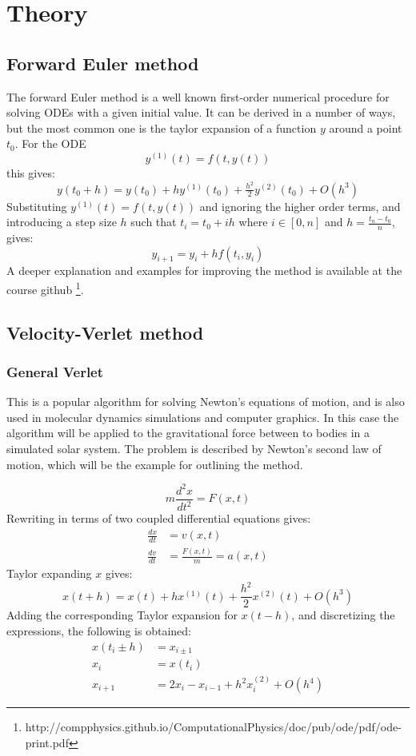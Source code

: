 \section{Theory}
\subsection{Forward Euler method}
The forward Euler method is a well known first-order numerical procedure for solving ODEs with a 
given initial value. It can be derived in a number of ways, but the most common one is the 
taylor expansion of a function $y$ around a point $t_0$. For the ODE 
$$y^{(1)}(t) = f(t,y(t))$$ this gives:
\begin{equation*}
y(t_0 + h) =  y(t_0) + hy^{(1)}(t_0) + \tfrac{h^2}{2}y^{(2)}(t_0) + O(h^3)
\end{equation*}
Substituting $y^{(1)}(t) = f(t,y(t))$ and ignoring the higher order terms, and introducing a step size
$h$ such that $t_i = t_0 + ih$ where $i \in [0,n]$ and $h = \frac{t_n-t_0}{n}$, gives:
\begin{equation*} 
y_{i+1} = y_i + hf(t_i, y_i)
\end{equation*}
A deeper explanation and examples for improving the method is available at the course github
\footnote{http://compphysics.github.io/ComputationalPhysics/doc/pub/ode/pdf/ode-print.pdf}.

\subsection{Velocity-Verlet method}
\subsubsection{General Verlet}
This is a popular algorithm for solving Newton's equations of motion, and is also used in  
molecular dynamics simulations and computer graphics. In this case the algorithm will be  
applied to the gravitational force between to bodies in a simulated solar system. 
The problem is described by Newton's second law of motion, which will be the example for outlining
the method.

\begin{equation*}
m\frac{d^2x}{dt^2}= F(x,t)
\end{equation*}
Rewriting in terms of two coupled differential equations gives:
\begin{align*}
\frac{dx}{dt} &= v(x,t) \\
\frac{dv}{dt} &= \frac{F(x,t)}{m} = a(x,t)
\end{align*}
Taylor expanding $x$ gives:
\begin{equation*}
x(t+h) = x(t) + hx^{(1)}(t) + \frac{h^2}{2}x^{{(2)}}(t) + O(h^3)
\end{equation*}
Adding the corresponding Taylor expansion for $x(t-h)$, and discretizing the expressions,
the following is obtained:
\begin{align*}
x(t_i \pm h) &= x_{i\pm 1} \\
x_i &= x(t_i) \\
x_{i+1} &= 2x_i - x_{i-1} + h^2 x_i^{{(2)}} + O(h^4)
\end{align*}
